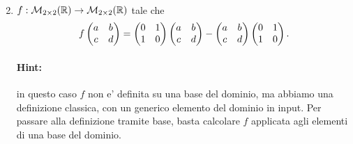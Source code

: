 \begin{exercise}
\begin{enumerate}
\begin{align*}
        \end{align*}
        \item $f : \mathcal{M}_{2\times 2}(\mathbb{R}) \to \mathcal{M}_{2\times 2}(\mathbb{R})$ tale che \begin{align*}
            f\begin{pmatrix} a&b\\c&d \end{pmatrix} = \begin{pmatrix} 0&1\\1&0 \end{pmatrix}\begin{pmatrix} a&b\\c&d \end{pmatrix} - \begin{pmatrix} a&b\\c&d \end{pmatrix}\begin{pmatrix} 0&1\\1&0 \end{pmatrix}.
        \end{align*}

        \paragraph{Hint:} in questo caso $f$ non e' definita su una base del dominio, ma abbiamo una definizione classica, con un generico elemento del dominio in input. Per passare alla definizione tramite base, basta calcolare $f$ applicata agli elementi di una base del dominio.
    \end{enumerate}
\end{exercise}


